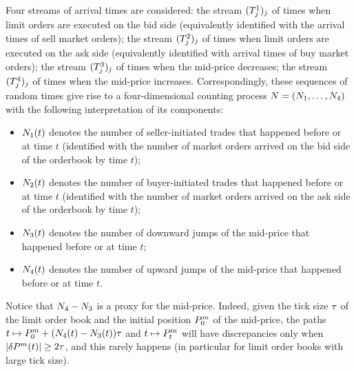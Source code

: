 \documentclass[10pt, article,table]{article}
\begin{document}
Four streams of arrival times are considered: the stream $(\arrivalTimes[1]_j)_j$ of times when limit orders are executed on the bid side (equivalently identified with the arrival times of sell market orders); the stream  $(\arrivalTimes[2]_j)_j$ of times when limit orders are executed on the ask side (equivalently identified with arrival times of buy market orders); the stream  $(\arrivalTimes[3]_j)_j$ of times when the mid-price decreases; the stream  $(\arrivalTimes[4]_j)_j$ of times when the mid-price increases. Correspondingly, these sequences of random times give rise to a four-dimensional counting process $\multiCountingProc=(\countingProc[1],\dots, \countingProc[4])$ with the following interpretation of its components:
\begin{itemize}
 \item $\countingProc[1](t)$ denotes the number of seller-initiated trades that happened before or at time $t$ (identified with the number of market orders arrived on the bid side of the orderbook by time $t$);
 \item $\countingProc[2](t)$ denotes the number of buyer-initiated trades that happened before or at time $t$ (identified with the number of market orders arrived on the ask side of the orderbook by time $t$);
 \item $\countingProc[3](t)$ denotes the number of downward jumps of the mid-price  that happened before or at time $t$;
 \item $\countingProc[4](t)$ denotes the number of upward jumps of the mid-price  that happened before or at time $t$.
\end{itemize}

Notice that $\countingProc[4]-\countingProc[3]$ is a proxy for the mid-price. Indeed, given the tick size $\tickSizeOfLOB$ of the limit order book and the initial position $\midprice_0$ of the mid-price,  the paths $t\mapsto \midprice_0 +(\countingProc[4](t)-\countingProc[3](t))\tickSizeOfLOB$ and $t\mapsto \midprice_t$ will have discrepancies only when $\vert\delta\midprice(t)\vert \geq 2\tickSizeOfLOB$, and this rarely happens (in particular for limit order books with large tick size).
\end{document}
